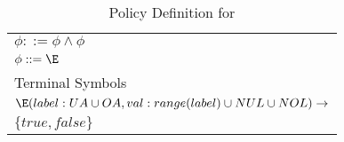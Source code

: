 \begin{table} 
\centering
\caption{Policy Definition for \elabac{}}
\label{table:sabac-def}
\begin{tabular}{@{}l@{}}
 \toprule	
	$\phi ::= \phi \land \phi  $\\
	$\phi ::= \E $ \\	 
	Terminal Symbols\\
	$ \E (label: UA \cup OA, val: range(label) \cup NUL \cup NOL)  \to$ \\ \hfill $\{true, false\}$ \\
 \bottomrule
\end{tabular}
\end{table}